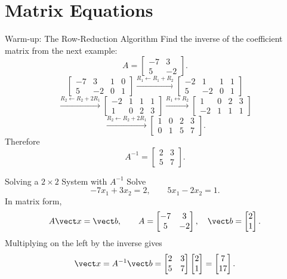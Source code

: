 \section{Matrix Equations}

\begin{frame}{Warm-up: The Row-Reduction Algorithm}
Find the inverse of the coefficient matrix from the next example:
\[
A=\begin{bmatrix}-7&3\\5&-2\end{bmatrix}.
\]
\pause
\small
\[
\left[\begin{array}{cc|cc}-7&3&1&0\\5&-2&0&1\end{array}\right]
\xrightarrow{R_1\leftarrow R_1+R_2}
\left[\begin{array}{cc|cc}-2&1&1&1\\5&-2&0&1\end{array}\right]
\]
\[
\xrightarrow{R_2\leftarrow R_2+2R_1}
\left[\begin{array}{cc|cc}-2&1&1&1\\1&0&2&3\end{array}\right]
\xrightarrow{R_1\leftrightarrow R_2}
\left[\begin{array}{cc|cc}1&0&2&3\\-2&1&1&1\end{array}\right]
\]
\[
\xrightarrow{R_2\leftarrow R_2+2R_1}
\left[\begin{array}{cc|cc}1&0&2&3\\0&1&5&7\end{array}\right].
\]
\pause
Therefore
\[
A^{-1}=\begin{bmatrix}2&3\\5&7\end{bmatrix}.
\]
\end{frame}

\begin{frame}{Solving a $2\times2$ System with $A^{-1}$}
Solve
\[
-7x_1+3x_2=2,\qquad 5x_1-2x_2=1.
\]
\pause
In matrix form,
\[
A\vect x=\vect b,\qquad
A=\begin{bmatrix}-7&3\\5&-2\end{bmatrix},\quad
\vect b=\begin{bmatrix}2\\1\end{bmatrix}.
\]
\pause
Multiplying on the left by the inverse gives
\[
\vect x=A^{-1}\vect b
=\begin{bmatrix}2&3\\5&7\end{bmatrix}
\begin{bmatrix}2\\1\end{bmatrix}
=\begin{bmatrix}7\\17\end{bmatrix}.
\]
\end{frame}

